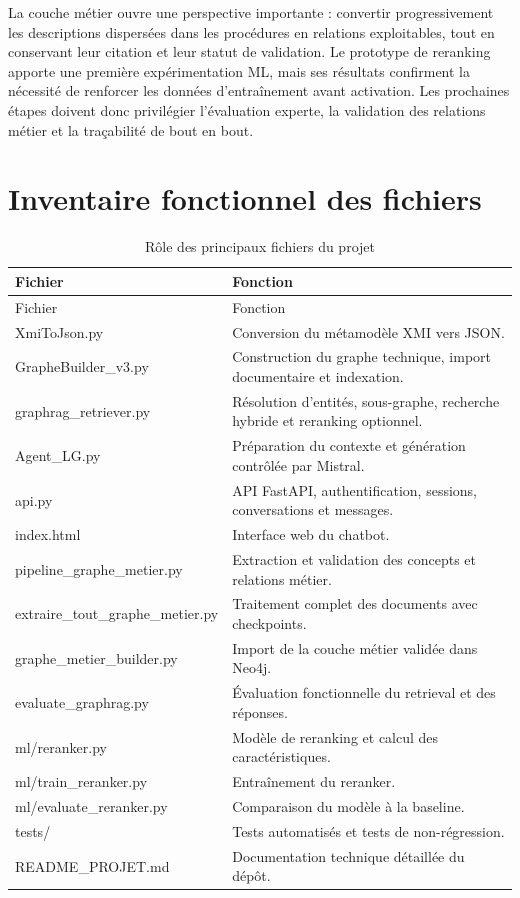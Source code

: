 \documentclass[12pt,a4paper,oneside]{report}
\begin{document}
La couche métier ouvre une perspective importante : convertir progressivement les descriptions dispersées dans les procédures en relations exploitables, tout en conservant leur citation et leur statut de validation. Le prototype de reranking apporte une première expérimentation ML, mais ses résultats confirment la nécessité de renforcer les données d'entraînement avant activation. Les prochaines étapes doivent donc privilégier l'évaluation experte, la validation des relations métier et la traçabilité de bout en bout.

\appendix
\chapter{Inventaire fonctionnel des fichiers}

\begin{longtable}{>{\ttfamily}p{}p{}}
\caption{Rôle des principaux fichiers du projet}\\
\toprule
Fichier & Fonction \\
\midrule
\endfirsthead
\toprule
Fichier & Fonction \\
\midrule
\endhead
XmiToJson.py & Conversion du métamodèle XMI vers JSON. \\
GrapheBuilder\_v3.py & Construction du graphe technique, import documentaire et indexation. \\
graphrag\_retriever.py & Résolution d'entités, sous-graphe, recherche hybride et reranking optionnel. \\
Agent\_LG.py & Préparation du contexte et génération contrôlée par Mistral. \\
api.py & API FastAPI, authentification, sessions, conversations et messages. \\
index.html & Interface web du chatbot. \\
pipeline\_graphe\_metier.py & Extraction et validation des concepts et relations métier. \\
extraire\_tout\_graphe\_metier.py & Traitement complet des documents avec checkpoints. \\
graphe\_metier\_builder.py & Import de la couche métier validée dans Neo4j. \\
evaluate\_graphrag.py & Évaluation fonctionnelle du retrieval et des réponses. \\
ml/reranker.py & Modèle de reranking et calcul des caractéristiques. \\
ml/train\_reranker.py & Entraînement du reranker. \\
ml/evaluate\_reranker.py & Comparaison du modèle à la baseline. \\
tests/ & Tests automatisés et tests de non-régression. \\
README\_PROJET.md & Documentation technique détaillée du dépôt. \\
\bottomrule
\end{longtable}
\end{document}
